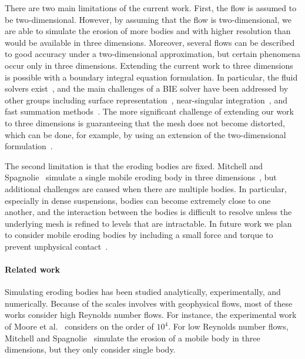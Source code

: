 \documentclass[preprint, 10pt]{elsarticle}
\begin{document}
There are two main limitations of the current
work.  First, the flow is assumed to be two-dimensional.  However, by
assuming that the flow is two-dimensional, we are able to simulate the
erosion of more bodies and with higher resolution than would be
available in three dimensions.  Moreover, several flows can be described
to good accuracy under a two-dimensional approximation, but certain
phenomena occur only in three dimensions.  Extending the current work to
three dimensions is possible with a boundary integral equation
formulation.  In particular, the fluid solvers exist~\cite{mal-bir2015},
and the main challenges of a BIE solver have been addressed by other
groups including surface representation~\cite{yin-bir-zor2006,
vee-rah-bir-zor2011}, near-singular integration~\cite{yin-bir-zor2006,
kli-tor2016b}, and fast summation methods~\cite{yin-bir-zor2004,
ros-ols2015}.  The more significant challenge of extending our work to
three dimensions is guaranteeing that the mesh does not become
distorted, which can be done, for example, by using an extension of the
two-dimensional {\thL} formulation~\cite{amb-sie-tlu2013}.

The second limitation is that the eroding bodies are fixed.  Mitchell
and Spagnolie~\cite{mit-spa2016} simulate a single mobile eroding body
in three dimensions~\cite{mit-spa2016}, but additional challenges are
caused when there are multiple bodies. In particular, especially in
dense suspensions, bodies can become extremely close to one another, and
the interaction between the bodies is difficult to resolve unless the
underlying mesh is refined to levels that are intractable. In future
work we plan to consider mobile eroding bodies by including a small
force and torque to prevent unphysical contact~\cite{lu-rah-zor2017}.

\paragraph{Related work} Simulating eroding bodies has been studied
analytically, experimentally, and numerically.  Because of the scales
involves with geophysical flows, most of these works consider high
Reynolds number flows.  For instance, the experimental work of Moore et
al.~\cite{moo-ris-chi-zha-she2013} considers on the order of $10^4$.
For low Reynolds number flows, Mitchell and Spagnolie~\cite{mit-spa2016}
simulate the erosion of a mobile body in three dimensions, but they only
consider single body.  
\end{document}
